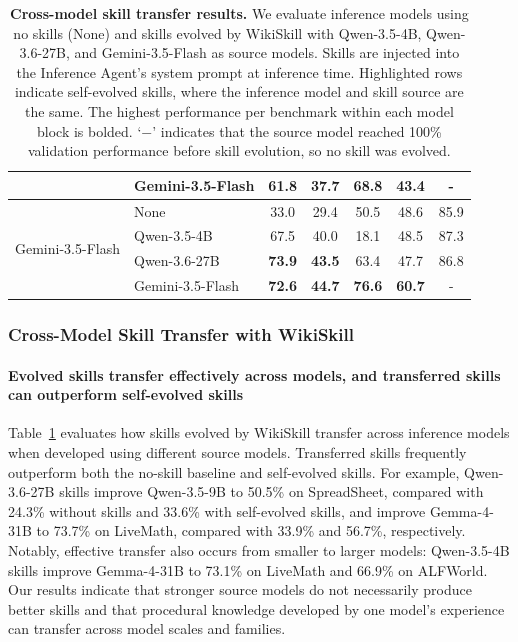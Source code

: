 \documentclass[11pt, a4paper, copyright, gr]{google}
\newcommand{\methodcolor}[1]{\cellcolor[HTML]{FDE293}#1}
\newcommand{\method}{WikiSkill\xspace}
\begin{document}
\begin{table}[t]
\begin{tabular}{llccccc}
 & Gemini-3.5-Flash & 61.8 & 37.7 & \textbf{68.8} & 43.4 & - \\
\midrule
\multirow{4}{*}{Gemini-3.5-Flash} & None & 33.0 & 29.4 & 50.5 & 48.6 & 85.9 \\
 & Qwen-3.5-4B & 67.5 & 40.0 & 18.1 & 48.5 & 87.3\\
 & Qwen-3.6-27B & \textbf{73.9} & \textbf{43.5} & 63.4 & 47.7 & 86.8\\
 & \methodcolor{Gemini-3.5-Flash} & \methodcolor{\textbf{72.6}} & \methodcolor{\textbf{44.7}} & \methodcolor{\textbf{76.6}} & \methodcolor{\textbf{60.7}} & \methodcolor{-} \\
\bottomrule
\end{tabular}
\caption{
\textbf{Cross-model skill transfer results.} We evaluate inference models using no skills (None) and skills evolved by \method with Qwen-3.5-4B, Qwen-3.6-27B, and Gemini-3.5-Flash as source models. Skills are injected into the Inference Agent's system prompt at inference time. Highlighted rows indicate self-evolved skills, where the inference model and skill source are the same. The highest performance per benchmark within each model block is bolded. `$-$' indicates that the source model reached 100\% validation performance before skill evolution, so no skill was evolved.
}
\label{tab:cross_model_transfer}
\vspace{-5pt}
\end{table}

\subsubsection{Cross-Model Skill Transfer with \method}
\label{subsec:cross_model_transfer}

\vspace{-5pt}
\paragraph{Evolved skills transfer effectively across models, and transferred skills can outperform self-evolved skills} Table~\ref{tab:cross_model_transfer} evaluates how skills evolved by WikiSkill transfer across inference models when developed using different source models. Transferred skills frequently outperform both the no-skill baseline and self-evolved skills. For example, Qwen-3.6-27B skills improve Qwen-3.5-9B to 50.5\% on SpreadSheet, compared with 24.3\% without skills and 33.6\% with self-evolved skills, and improve Gemma-4-31B to 73.7\% on LiveMath, compared with 33.9\% and 56.7\%, respectively. Notably, effective transfer also occurs from smaller to larger models: Qwen-3.5-4B skills improve Gemma-4-31B to 73.1\% on LiveMath and 66.9\% on ALFWorld. Our results indicate that stronger source models do not necessarily produce better skills and that procedural knowledge developed by one model's experience can transfer across model scales and families.
\end{document}
